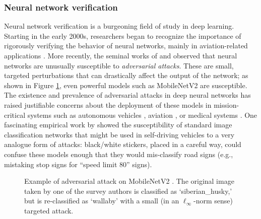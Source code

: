 \subsubsection{Neural network verification} \label{sec:verification}
Neural network verification is a burgeoning field of study in deep learning. 
Starting in the early 2000s, researchers began to recognize the importance of rigorously verifying the behavior of neural networks, mainly in aviation-related applications \citep{schumann2003verification,zakrzewski2001verification}. 
More recently, the seminal works of \cite{szegedy2014intriguing} and \cite{goodfellow2015explaining} observed that neural networks are unusually susceptible to \emph{adversarial attacks}. These are small, targeted perturbations that can drastically affect the output of the network; as shown in Figure \ref{fig:adversarial}, even powerful models such as MobileNetV2 \citep{sandler2018mobilenetv2} are susceptible. The existence and prevalence of adversarial attacks in deep neural networks has raised justifiable concerns about the deployment of these models in mission-critical systems such as autonomous vehicles \citep{deng2020analysis}, aviation \citep{kouvaros2021formal}, or medical systems \citep{finlayson2019adversarial}. One fascinating empirical work by  \cite{eykholt2018robust} showed the susceptibility of standard image classification networks that might be used in self-driving vehicles to a very analogue form of attacks: black/white stickers, placed in a careful way, could confuse these models enough that they would mis-classify road signs (e.g., mistaking stop signs for ``speed limit 80'' signs).

\begin{figure}
    \centering
    \caption{Example of adversarial attack on MobileNetV2 \citep{sandler2018mobilenetv2}. The original image taken by one of the survey authors is classified as `siberian\_husky,' but is re-classified as `wallaby' with a small (in an $\ell_\infty$-norm sense) targeted attack.}
    \label{fig:adversarial}
\end{figure}

